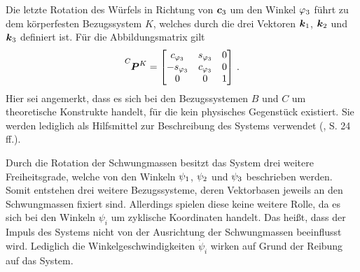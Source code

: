 Die letzte Rotation des Würfels in Richtung von $\boldsymbol{c}_{\text{3}}$ um den Winkel $\varphi_{\text{3}}$ führt zu dem körperfesten Bezugssystem $K$, welches durch die drei Vektoren $\boldsymbol{k}_{\text{1}}$, $\boldsymbol{k}_{\text{2}}$ und $\boldsymbol{k}_{\text{3}}$ definiert ist. Für die Abbildungsmatrix gilt 
\begin{equation}
\pMat{C}{K} = \begin{bmatrix}
c_{\varphi\idx3} & s_{\varphi\idx3} & 0 \\ -s_{\varphi\idx3} & c_{\varphi\idx3} & 0 \\ 0 & 0 & 1
\end{bmatrix} \,.
\end{equation}
Hier sei angemerkt, dass es sich bei den Bezugssystemen $B$ und $C$ um theoretische Konstrukte handelt, für die kein physisches Gegenstück existiert. Sie werden lediglich als Hilfsmittel zur Beschreibung des Systems verwendet (\cite{KaneBook}, S. 24 ff.).

Durch die Rotation der Schwungmassen besitzt das System drei weitere Freiheitsgrade, welche von den Winkeln $\psi_{\text{1}}$, $\psi_{\text{2}}$ und $\psi_{\text{3}}$ beschrieben werden. Somit entstehen drei weitere Bezugssysteme, deren Vektorbasen jeweils an den Schwungmassen fixiert sind. Allerdings spielen diese keine weitere Rolle, da es sich bei den Winkeln $\psi_i$ um zyklische Koordinaten handelt. Das heißt, dass der Impuls des Systems nicht von der Ausrichtung der Schwungmassen beeinflusst wird. Lediglich die Winkelgeschwindigkeiten $\dot{\psi}_i$ wirken auf Grund der Reibung auf das System.

